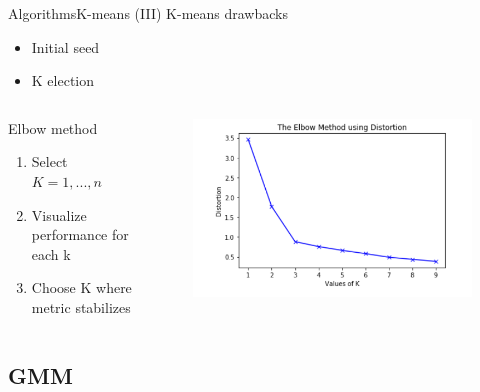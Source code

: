\documentclass[10pt,compress]{beamer} %
\begin{document}
\begin{frame}[fragile]{Algorithms}{K-means (III)}
    K-means drawbacks
    \begin{itemize}
        \item Initial seed
        \item K election
    \end{itemize}

    \begin{columns}
        \begin{block}{Elbow method}
           \begin{enumerate}
            \item Select $K=1, ..., n$
            \item Visualize performance for each k
            \item Choose K where metric stabilizes
           \end{enumerate} 
        \end{block}
			\begin{figure}
		        \includegraphics[width=\textwidth]{figs/elbow.png}
			\end{figure}
    \end{columns}

\end{frame}

\subsection{GMM}
\end{document}
